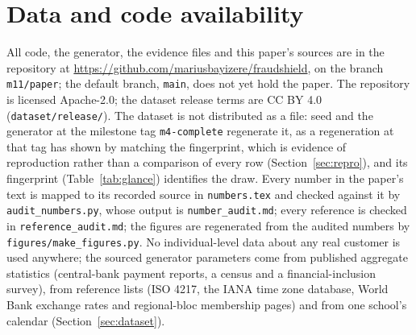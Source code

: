 \section*{Data and code availability}

All code, the generator, the evidence files and this paper's sources are in the repository at
\url{https://github.com/mariusbayizere/fraudshield}, on the branch \texttt{m11/paper}; the default
branch, \texttt{main}, does not yet hold the paper. The repository is licensed Apache-2.0; the dataset release terms are
CC BY 4.0 (\texttt{dataset/release/}). The dataset is not distributed as a file: seed \nSeed{} and the
generator at the milestone tag \texttt{m4-complete} regenerate it, as a regeneration at that tag has
shown by matching the fingerprint, which is evidence of reproduction rather than a comparison of every
row (Section~\ref{sec:repro}), and its fingerprint (Table~\ref{tab:glance}) identifies
the draw. Every number in the paper's text is mapped to its recorded source in \texttt{numbers.tex} and
checked against it by \texttt{audit\_numbers.py}, whose output is \texttt{number\_audit.md}; every
reference is checked in \texttt{reference\_audit.md}; the figures are regenerated from the audited
numbers by \texttt{figures/make\_figures.py}. No individual-level data about any real customer is used anywhere;
the \nProvSourced{} sourced generator parameters come from published aggregate statistics (central-bank
payment reports, a census and a financial-inclusion survey), from reference lists (ISO 4217, the IANA
time zone database, World Bank exchange rates and regional-bloc membership pages) and from one
school's calendar (Section~\ref{sec:dataset}).
